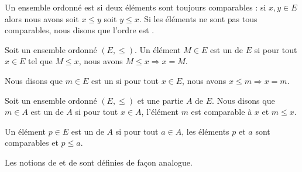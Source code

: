 \begin{definition}      \label{DEFooVGYQooUhUZGr}
	Un ensemble ordonné est  si deux éléments sont toujours comparables : si \( x,y\in E\) alors nous avons soit \( x\leq y\) soit \( y\leq x\). Si les éléments ne sont pas tous comparables, nous disons que l'ordre est .
\end{definition}

\begin{definition}        \label{DEFooBZNRooYRPGme}
	Soit un ensemble ordonné \( (E,\leq)\). Un élément \(M\in E\) est un  de \( E\) si pour tout \( x\in E\) tel que \( M\leq x\), nous avons \( M\leq x\Rightarrow x=M\).

	Nous disons que \( m\in E\) est un  si pour tout \( x\in E\), nous avons \( x\leq m\Rightarrow x=m\).
\end{definition}

\begin{definition}      \label{DEFooDNWRooTiMAzK}
	Soit un ensemble ordonné \( (E,\leq)\) et une partie \( A\) de \( E\). Nous disons que \( m\in A\) est un  de \( A\) si pour tout \( x\in A\), l'élément \( m\) est comparable à \( x\) et \( m\leq x\).

	Un élément \( p\in E\) est un  de \( A\) si pour tout \( a\in A\), les éléments \( p\) et \( a\) sont comparables et \( p\leq a\).

	Les notions de  et de  sont définies de façon analogue.
\end{definition}

